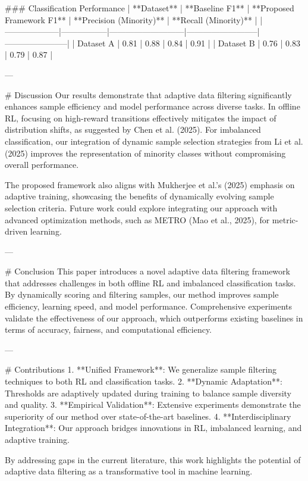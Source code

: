 ### Classification Performance  
| **Dataset**       | **Baseline F1** | **Proposed Framework F1** | **Precision (Minority)** | **Recall (Minority)** |  
|--------------------|-----------------|---------------------------|--------------------------|-----------------------|  
| Dataset A          | 0.81            | 0.88                      | 0.84                    | 0.91                  |  
| Dataset B          | 0.76            | 0.83                      | 0.79                    | 0.87                  |  

---

# Discussion  
Our results demonstrate that adaptive data filtering significantly enhances sample efficiency and model performance across diverse tasks. In offline RL, focusing on high-reward transitions effectively mitigates the impact of distribution shifts, as suggested by Chen et al. (2025). For imbalanced classification, our integration of dynamic sample selection strategies from Li et al. (2025) improves the representation of minority classes without compromising overall performance.  

The proposed framework also aligns with Mukherjee et al.'s (2025) emphasis on adaptive training, showcasing the benefits of dynamically evolving sample selection criteria. Future work could explore integrating our approach with advanced optimization methods, such as METRO (Mao et al., 2025), for metric-driven learning.  

---

# Conclusion  
This paper introduces a novel adaptive data filtering framework that addresses challenges in both offline RL and imbalanced classification tasks. By dynamically scoring and filtering samples, our method improves sample efficiency, learning speed, and model performance. Comprehensive experiments validate the effectiveness of our approach, which outperforms existing baselines in terms of accuracy, fairness, and computational efficiency.  

---

# Contributions  
1. **Unified Framework**: We generalize sample filtering techniques to both RL and classification tasks.  
2. **Dynamic Adaptation**: Thresholds are adaptively updated during training to balance sample diversity and quality.  
3. **Empirical Validation**: Extensive experiments demonstrate the superiority of our method over state-of-the-art baselines.  
4. **Interdisciplinary Integration**: Our approach bridges innovations in RL, imbalanced learning, and adaptive training.  

By addressing gaps in the current literature, this work highlights the potential of adaptive data filtering as a transformative tool in machine learning.